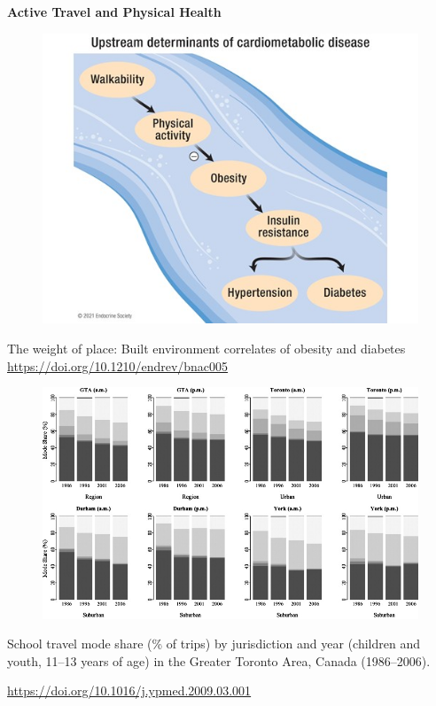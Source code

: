 \documentclass[aspectratio=169]{beamer}
\begin{document}
\begin{frame}
	\textbf{Active Travel and Physical Health}
	
	\begin{figure}
		\centering
		\includegraphics[width=0.6\linewidth]{images/walkability_health}
	\end{figure}
	
	\tiny The weight of place: Built environment correlates of obesity and diabetes \url{https://doi.org/10.1210/endrev/bnac005}
	
\end{frame}


\begin{frame}
	
	\begin{figure}
		\centering
		\includegraphics[width=0.9\linewidth]{images/mode_to_school}
	\end{figure}
	
	
	\tiny School travel mode share (\% of trips) by jurisdiction and year (children and youth, 11–13 years of age) in the Greater Toronto Area, Canada (1986–2006).
	
	\tiny\url{https://doi.org/10.1016/j.ypmed.2009.03.001}
	
\end{frame}
\end{document}

